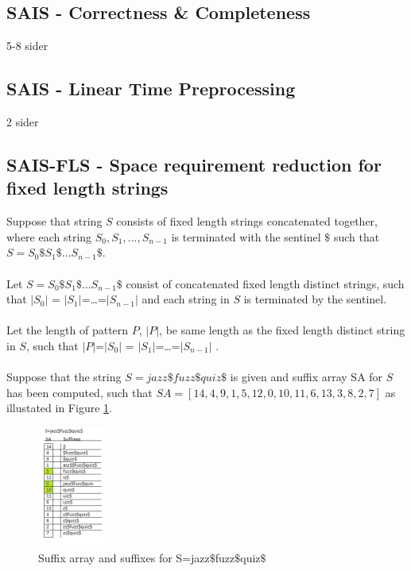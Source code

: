 \documentclass[12pt]{article} %
\begin{document}
\subsection{SAIS - Correctness \& Completeness}
5-8 sider
\subsection{SAIS - Linear Time Preprocessing}
2 sider
\subsection{SAIS-FLS - Space requirement reduction for fixed length strings}

Suppose that string $S$ consists of fixed length strings concatenated together, where each string $S_0,S_1,...,S_{n-1}$ is terminated with the sentinel $\$$ such that $S=S_0\$S_1\$...S_{n-1}\$ $.
\\ \\
Let $S=S_0\$S_1\$...S_{n-1}\$ $ consist of concatenated fixed length distinct strings, such that $|S_0|$ = $|S_1|$=…=$|S_{n-1}|$ and each string in $S$ is terminated by the sentinel.
\\ \\
Let the length of pattern $P$, $|P|$, be same length as the fixed length distinct string in $S$, such that $|P|$=$|S_0|$ = $|S_1|$=…=$|S_{n-1}|$ .
\\ \\
Suppose that the string $S=jazz\$fuzz\$quiz\$$  is given and suffix array SA for $S$ has been computed, such that $SA=[14,4,9,1,5,12,0,10,11,6,13,3,8,2,7]$ as illustated in Figure \ref{fig:jazz}.

\begin{figure}[H]
    \centering
    \includegraphics[width=0.2\textwidth]{jazz}
    \captionsetup{width=0.8
    \textwidth}
    \caption{Suffix array and suffixes for S=jazz$\$$fuzz$\$$quiz$\$$}
    \label{fig:jazz}
\end{figure}
\end{document}
